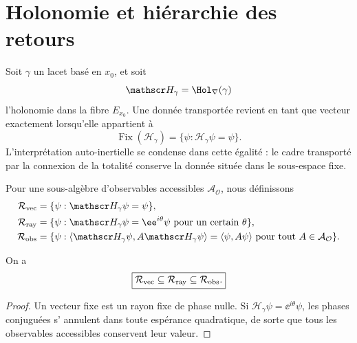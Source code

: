 \section{Holonomie et hiérarchie des retours}

Soit \(\gamma\) un lacet basé en \(x_0\), et soit
\begin{equation}
 \mathscr H_\gamma=\Hol_\nabla(\gamma)
 \label{eq:rm-obs-holonomy}
\end{equation}
l'holonomie dans la fibre \(E_{x_0}\). Une donnée transportée revient en tant que
vecteur exactement lorsqu'elle appartient à
\begin{equation}
 \operatorname{Fix}(\mathscr H_\gamma)
 =\{\psi:\mathscr H_\gamma\psi=\psi\}.
 \label{eq:rm-obs-fix-holonomy}
\end{equation}
L'interprétation auto-inertielle se condense dans cette égalité : le cadre
transporté par la connexion de la totalité conserve la donnée située dans
le sous-espace fixe.

Pour une sous-algèbre d'observables accessibles
\(\mathcal A_{\mathcal O}\), nous définissons
\begin{align}
 \mathcal R_{\rm vec}
 &=\{\psi:\mathscr H_\gamma\psi=\psi\},
 \label{eq:rm-obs-return-vector}\\
 \mathcal R_{\rm ray}
 &=\{\psi:\mathscr H_\gamma\psi=\ee^{i\theta}\psi
 \text{ pour un certain }\theta\},
 \label{eq:rm-obs-return-ray}\\
 \mathcal R_{\rm obs}
 &=\{\psi:
 \langle\mathscr H_\gamma\psi,A\mathscr H_\gamma\psi\rangle
 =\langle\psi,A\psi\rangle
 \text{ pour tout }A\in\mathcal A_{\mathcal O}\}.
 \label{eq:rm-obs-return-observable}
\end{align}

\begin{proposition}
\label{prop:rm-obs-return-hierarchy}
On a
\begin{equation}
 \boxed{
 \mathcal R_{\rm vec}
 \subseteq\mathcal R_{\rm ray}
 \subseteq\mathcal R_{\rm obs}.}
 \label{eq:rm-obs-return-hierarchy}
\end{equation}
\end{proposition}

\begin{proof}
Un vecteur fixe est un rayon fixe de phase nulle. Si
\(\mathscr H_\gamma\psi=\ee^{i\theta}\psi\), les phases conjuguées s'
annulent dans toute espérance quadratique, de sorte que tous les observables
accessibles conservent leur valeur.
\end{proof}

